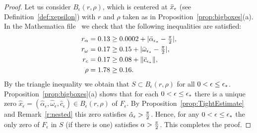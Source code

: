 \begin{proof}
Let us consider
$B_\epsilon(r,\rho)$, which is centered at $\bar{x}_\epsilon$ (see Definition~\ref{def:xepsilon})
with $r$ and $ \rho$ taken as in Proposition~\ref{prop:bigboxes}(a).
In the Mathematica file~\cite{mathematicafile} 
we check that the following inequalities are satisfied:
\begin{alignat*}{1}
r_\alpha &= 0.13 \geq  0.0002 + |\bar{\alpha}_{\epsilon_*}-\tfrac{\pi}{2}|,\\
r_\omega &= 0.17 \geq  0.15 + |\bar{\omega}_{\epsilon_*}-\tfrac{\pi}{2}| ,\\
r_c &= 0.17 \geq   0.08 + \| \bar{c}_{\epsilon_*}\|,\\
\rho &= 1.78 \geq 0.16 . 
\end{alignat*}
By the triangle inequality we obtain that $S \subset B_\epsilon(r,\rho)$ for all $0<\epsilon\leq \epsilon_*$.
Proposition~\ref{prop:bigboxes}(a) shows that for each $0<\epsilon\leq \epsilon_*$
there is a unique zero $\hat{x}_\epsilon=
(\hat{\alpha}_\epsilon,\hat{\omega}_\epsilon,\hat{c}_\epsilon) \in B_\epsilon (r,\rho)$ of $F_\epsilon$.
By Proposition~\ref{prop:TightEstimate} and Remark~\ref{r:nested}
this zero satisfies $\hat{\alpha}_\epsilon > \tfrac{\pi}{2}$.
Hence, for any $0<\epsilon\leq\epsilon_*$ the only zero of $F_\epsilon$ in $S$ (if there is one) satisfies $\alpha>\tfrac{\pi}{2}$. This completes the proof.

\end{proof}
% 
